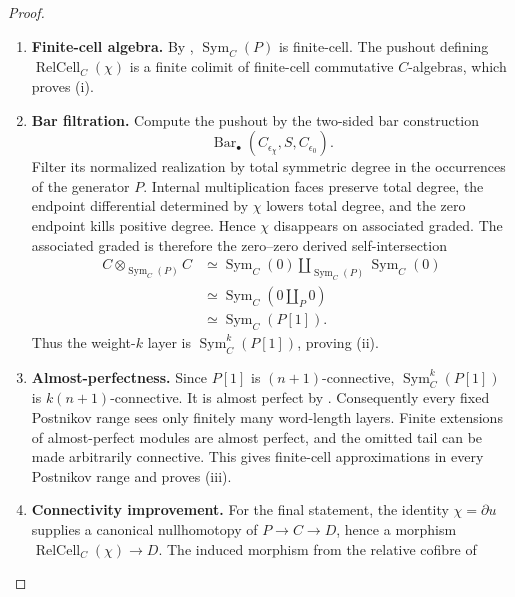 \begin{proof}
\leavevmode
\begin{enumerate}[label=\textup{(\arabic*)}]
    \item \textbf{Finite-cell algebra.}
    By ,
    \(\operatorname{Sym}_C(P)\) is finite-cell. The pushout defining
    \(\operatorname{RelCell}_C(\chi)\) is a finite colimit of finite-cell commutative \(C\)-algebras,
    which proves \textup{(i)}.
    \item \textbf{Bar filtration.}
    Compute the pushout by the two-sided bar construction
    \[
        \operatorname{Bar}_\bullet
        (C_{\epsilon_\chi},S,C_{\epsilon_0}).
    \]
    Filter its normalized realization by total symmetric degree in the occurrences
    of the generator \(P\). Internal multiplication faces preserve total degree,
    the endpoint differential determined by \(\chi\) lowers total degree, and the
    zero endpoint kills positive degree. Hence \(\chi\) disappears on associated
    graded. The associated graded is therefore the zero--zero derived
    self-intersection
    \[
    \begin{aligned}
        C\otimes_{\operatorname{Sym}_C(P)}C
        &\simeq
        \operatorname{Sym}_C(0)
          \amalg_{\operatorname{Sym}_C(P)}
        \operatorname{Sym}_C(0)\\
        &\simeq
        \operatorname{Sym}_C(0\amalg_P0)\\
        &\simeq
        \operatorname{Sym}_C(P[1]).
    \end{aligned}
    \]
    Thus the weight-\(k\) layer is
    \(\operatorname{Sym}^k_C(P[1])\), proving \textup{(ii)}.
    \item \textbf{Almost-perfectness.}
    Since \(P[1]\) is \((n+1)\)-connective,
    \(\operatorname{Sym}^k_C(P[1])\) is \(k(n+1)\)-connective. It is almost
    perfect by . Consequently every
    fixed Postnikov range sees only finitely many word-length layers. Finite
    extensions of almost-perfect modules are almost perfect, and the omitted tail
    can be made arbitrarily connective. This gives finite-cell approximations in
    every Postnikov range and proves \textup{(iii)}.
    \item \textbf{Connectivity improvement.}
    For the final statement, the identity \(\chi=\partial u\) supplies a canonical
    nullhomotopy of \(P\to C\to D\), hence a morphism
    \(\operatorname{RelCell}_C(\chi)\to D\). The
    induced morphism from the relative cofibre of

\end{enumerate}
\end{proof}
